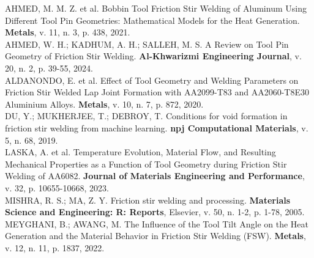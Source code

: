 \documentclass[12pt,openany]{report}
\begin{document}
\begin{singlespace}
\noindent AHMED, M. M. Z. et al. Bobbin Tool Friction Stir Welding of Aluminum Using Different Tool Pin Geometries: Mathematical Models for the Heat Generation. \textbf{Metals}, v. 11, n. 3, p. 438, 2021.\\[0.4cm]
\noindent AHMED, W. H.; KADHUM, A. H.; SALLEH, M. S. A Review on Tool Pin Geometry of Friction Stir Welding. \textbf{Al-Khwarizmi Engineering Journal}, v. 20, n. 2, p. 39-55, 2024.\\[0.4cm]
\noindent ALDANONDO, E. et al. Effect of Tool Geometry and Welding Parameters on Friction Stir Welded Lap Joint Formation with AA2099-T83 and AA2060-T8E30 Aluminium Alloys. \textbf{Metals}, v. 10, n. 7, p. 872, 2020.\\[0.4cm]
\noindent DU, Y.; MUKHERJEE, T.; DEBROY, T. Conditions for void formation in friction stir welding from machine learning. \textbf{npj Computational Materials}, v. 5, n. 68, 2019.\\[0.4cm]
\noindent LASKA, A. et al. Temperature Evolution, Material Flow, and Resulting Mechanical Properties as a Function of Tool Geometry during Friction Stir Welding of AA6082. \textbf{Journal of Materials Engineering and Performance}, v. 32, p. 10655-10668, 2023.\\[0.4cm]
\noindent MISHRA, R. S.; MA, Z. Y. Friction stir welding and processing. \textbf{Materials Science and Engineering: R: Reports}, Elsevier, v. 50, n. 1-2, p. 1-78, 2005.\\[0.4cm]
\noindent MEYGHANI, B.; AWANG, M. The Influence of the Tool Tilt Angle on the Heat Generation and the Material Behavior in Friction Stir Welding (FSW). \textbf{Metals}, v. 12, n. 11, p. 1837, 2022.
\end{singlespace}
\end{document}
